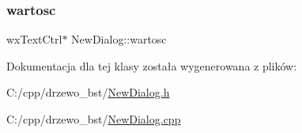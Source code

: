 \mbox{\label{class_new_dialog_a49642e1118d27d204d51b3fefa910436}} 
\subsubsection{\texorpdfstring{wartosc}{wartosc}}
{\footnotesize\ttfamily wx\+Text\+Ctrl$\ast$ New\+Dialog\+::wartosc}



Dokumentacja dla tej klasy została wygenerowana z plików\+:\begin{DoxyCompactItemize}
\item 
C\+:/cpp/drzewo\+\_\+bst/\mbox{\hyperlink{_new_dialog_8h}{New\+Dialog.\+h}}\item 
C\+:/cpp/drzewo\+\_\+bst/\mbox{\hyperlink{_new_dialog_8cpp}{New\+Dialog.\+cpp}}\end{DoxyCompactItemize}
